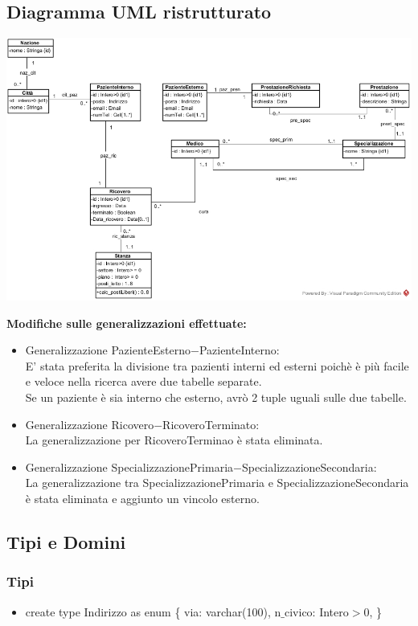 \documentclass[12pt, letterpaper]{article}
\begin{document}
\subsection{Diagramma UML ristrutturato}
\begin{center}
    \includegraphics[width=1\textwidth ]{images/Ristrutturato.jpg}
\end{center}
\textbf{Modifiche sulle generalizzazioni effettuate:}
\begin{itemize}
    \item Generalizzazione PazienteEsterno$-$PazienteInterno: \\
    E' stata preferita la divisione tra pazienti interni ed esterni poichè è più facile e veloce nella ricerca avere due tabelle separate.\\
    Se un paziente è sia interno che esterno, avrò 2 tuple uguali sulle due tabelle.
    \item Generalizzazione Ricovero$-$RicoveroTerminato: \\
    La generalizzazione per RicoveroTerminao è stata eliminata.
    \item Generalizzazione SpecializzazionePrimaria$-$SpecializzazioneSecondaria: \\
    La generalizzazione tra SpecializzazionePrimaria e SpecializzazioneSecondaria è stata eliminata e aggiunto un vincolo esterno.\\

\end{itemize}

\newpage
\subsection{Tipi e Domini}
\subsubsection{Tipi}
\begin{itemize}
    
    \item create type Indirizzo as enum \{
        via: varchar(100),
        n$\_$civico: Intero$>$0,
    \}

\end{itemize}
\end{document}
